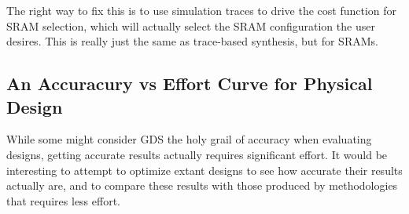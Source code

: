 \documentclass{article}
\begin{document}
The right way to fix this is to use simulation traces to drive the cost
function for SRAM selection, which will actually select the SRAM configuration
the user desires.  This is really just the same as trace-based synthesis, but
for SRAMs.

\subsection{An Accuracury vs Effort Curve for Physical Design}

While some might consider GDS the holy grail of accuracy when evaluating
designs, getting accurate results actually requires significant effort.  It
would be interesting to attempt to optimize extant designs to see how accurate
their results actually are, and to compare these results with those produced by
methodologies that requires less effort.
\end{document}
